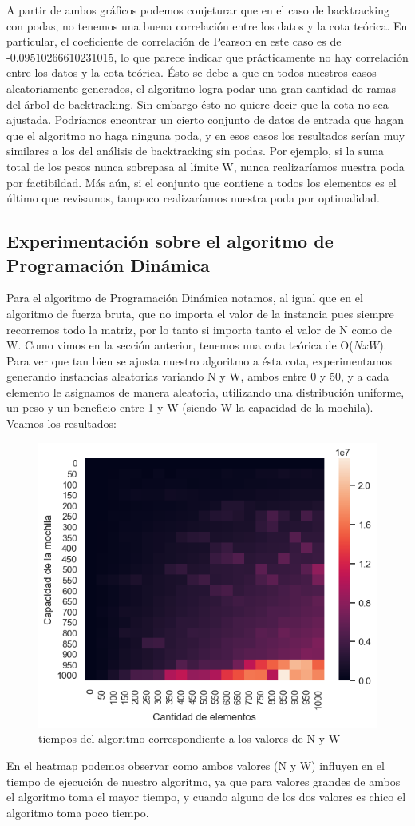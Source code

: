 A partir de ambos gráficos podemos conjeturar que en el caso de backtracking con podas, no tenemos una buena correlación entre los datos y la cota teórica. En particular, el coeficiente de correlación de Pearson en este caso es de -0.09510266610231015, lo que parece indicar que prácticamente no hay correlación entre los datos y la cota teórica. Ésto se debe a que en todos nuestros casos aleatoriamente generados, el algoritmo logra podar una gran cantidad de ramas del árbol de backtracking. Sin embargo ésto no quiere decir que la cota no sea ajustada. Podríamos encontrar un cierto conjunto de datos de entrada que hagan que el algoritmo no haga ninguna poda, y en esos casos los resultados serían muy similares a los del análisis de backtracking sin podas. Por ejemplo, si la suma total de los pesos nunca sobrepasa al límite W, nunca realizaríamos nuestra poda por factibildad. Más aún, si el conjunto que contiene a todos los elementos es el último que revisamos, tampoco realizaríamos nuestra poda por optimalidad.


\subsection{Experimentación sobre el algoritmo de Programación Dinámica}
Para el algoritmo de Programación Dinámica notamos, al igual que en el algoritmo de fuerza bruta, que no importa el valor de la instancia pues siempre recorremos todo la matriz, por lo tanto si importa tanto el valor de N como de W. Como vimos en la sección anterior, tenemos una cota teórica de O($NxW$). Para ver que tan bien se ajusta nuestro algoritmo a ésta cota, experimentamos generando instancias aleatorias variando N y W, ambos entre 0 y 50, y a cada elemento le asignamos de manera aleatoria, utilizando una distribución uniforme, un peso y un beneficio entre 1 y W (siendo W la capacidad de la mochila). Veamos los resultados:
\begin{center}

\begin{figure}[H]
     \centering
     \includegraphics[width=0.5\linewidth]{img/heatmap}
     \caption{tiempos del algoritmo correspondiente a los valores de N y W}
\end{figure}

\end{center}
En el heatmap podemos observar como ambos valores (N y W) influyen en el tiempo de ejecución de nuestro algoritmo, ya que para valores grandes de ambos el algoritmo toma el mayor tiempo, y cuando alguno de los dos valores es chico el algoritmo toma poco tiempo.

